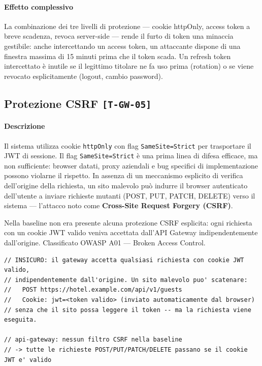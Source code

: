 ﻿\documentclass[a4paper,12pt]{report}
\newcommand{\threat}[1]{\texttt{\small\textcolor{vulnred}{[#1]}}}
\begin{document}
\paragraph{Effetto complessivo}
La combinazione dei tre livelli di protezione --- cookie httpOnly, access token
a breve scadenza, revoca server-side --- rende il furto di token una minaccia
gestibile: anche intercettando un access token, un attaccante dispone di una
finestra massima di 15 minuti prima che il token scada. Un refresh token
intercettato è inutile se il legittimo titolare ne fa uso prima (rotation) o se
viene revocato esplicitamente (logout, cambio password).

\subsection{Protezione CSRF \threat{T-GW-05}}

\paragraph{Descrizione}
Il sistema utilizza cookie \texttt{httpOnly} con flag \texttt{SameSite=Strict} per trasportare
il JWT di sessione. Il flag \texttt{SameSite=Strict} è una prima linea di difesa efficace,
ma non sufficiente: browser datati, proxy aziendali e bug specifici di implementazione possono
violarne il rispetto. In assenza di un meccanismo esplicito di verifica dell'origine della
richiesta, un sito malevolo può indurre il browser autenticato dell'utente a inviare richieste
mutanti (POST, PUT, PATCH, DELETE) verso il sistema --- l'attacco noto come
\textbf{Cross-Site Request Forgery (CSRF)}.

Nella baseline non era presente alcuna protezione CSRF esplicita: ogni richiesta con un cookie
JWT valido veniva accettata dall'API Gateway indipendentemente dall'origine.
Classificato OWASP A01 --- Broken Access Control.

\begin{insecurebox}[title={Pattern Vulnerabile --- assenza CSRF token (baseline)}]
\begin{lstlisting}[style=java]
// INSICURO: il gateway accetta qualsiasi richiesta con cookie JWT valido,
// indipendentemente dall'origine. Un sito malevolo puo' scatenare:
//   POST https://hotel.example.com/api/v1/guests
//   Cookie: jwt=<token valido> (inviato automaticamente dal browser)
// senza che il sito possa leggere il token -- ma la richiesta viene eseguita.

// api-gateway: nessun filtro CSRF nella baseline
// -> tutte le richieste POST/PUT/PATCH/DELETE passano se il cookie JWT e' valido
\end{lstlisting}
\end{insecurebox}
\end{document}
